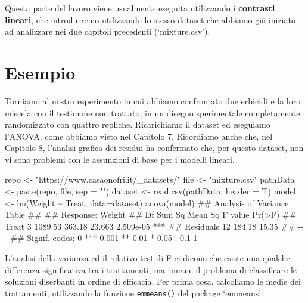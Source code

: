 \documentclass[a4paper,12pt,oneside]{book}
\newenvironment{Shaded}{\begin{snugshade}}{\end{snugshade}}
\newcommand{\SpecialCharTok}[1]{#1}
\newcommand{\StringTok}[1]{#1}
\newcommand{\DocumentationTok}[1]{#1}
\newcommand{\OtherTok}[1]{#1}
\newcommand{\FunctionTok}[1]{#1}
\newcommand{\AttributeTok}[1]{#1}
\newcommand{\NormalTok}[1]{#1}
\begin{document}
Questa parte del lavoro viene usualmente eseguita utilizzando i \textbf{contrasti lineari}, che introdurremo utilizzando lo stesso dataset che abbiamo già iniziato ad analizzare nei due capitoli precedenti (`mixture.csv').

\hypertarget{esempio}{%
\section{Esempio}\label{esempio}}

Torniamo al nostro esperimento in cui abbiamo confrontato due erbicidi e la loro miscela con il testimone non trattato, in un disegno sperimentale completamente randomizzato con quattro repliche. Ricarichiamo il dataset ed eseguiamo l'ANOVA, come abbiamo visto nel Capitolo 7. Ricordiamo anche che, nel Capitolo 8, l'analisi grafica dei residui ha confermato che, per questo dataset, non vi sono problemi con le assunzioni di base per i modelli lineari.

\begin{Shaded}
\begin{Highlighting}[]
\NormalTok{repo }\OtherTok{\textless{}{-}} \StringTok{"https://www.casaonofri.it/\_datasets/"}
\NormalTok{file }\OtherTok{\textless{}{-}} \StringTok{"mixture.csv"}
\NormalTok{pathData }\OtherTok{\textless{}{-}} \FunctionTok{paste}\NormalTok{(repo, file, }\AttributeTok{sep =} \StringTok{""}\NormalTok{)}
\NormalTok{dataset }\OtherTok{\textless{}{-}} \FunctionTok{read.csv}\NormalTok{(pathData, }\AttributeTok{header =}\NormalTok{ T)}
\NormalTok{model }\OtherTok{\textless{}{-}} \FunctionTok{lm}\NormalTok{(Weight }\SpecialCharTok{\textasciitilde{}}\NormalTok{ Treat, }\AttributeTok{data=}\NormalTok{dataset)}
\FunctionTok{anova}\NormalTok{(model)}
\DocumentationTok{\#\# Analysis of Variance Table}
\DocumentationTok{\#\# }
\DocumentationTok{\#\# Response: Weight}
\DocumentationTok{\#\#           Df  Sum Sq Mean Sq F value    Pr(\textgreater{}F)    }
\DocumentationTok{\#\# Treat      3 1089.53  363.18  23.663 2.509e{-}05 ***}
\DocumentationTok{\#\# Residuals 12  184.18   15.35                      }
\DocumentationTok{\#\# {-}{-}{-}}
\DocumentationTok{\#\# Signif. codes:  0 \textquotesingle{}***\textquotesingle{} 0.001 \textquotesingle{}**\textquotesingle{} 0.01 \textquotesingle{}*\textquotesingle{} 0.05 \textquotesingle{}.\textquotesingle{} 0.1 \textquotesingle{} \textquotesingle{} 1}
\end{Highlighting}
\end{Shaded}

L'analisi della varianza ed il relativo test di F ci dicono che esiste una qualche differenza significativa tra i trattamenti, ma rimane il problema di classificare le soluzioni diserbanti in ordine di efficacia. Per prima cosa, calcoliamo le medie dei trattamenti, utilizzando la funzione \texttt{emmeans()} del package `emmeans':
\end{document}
